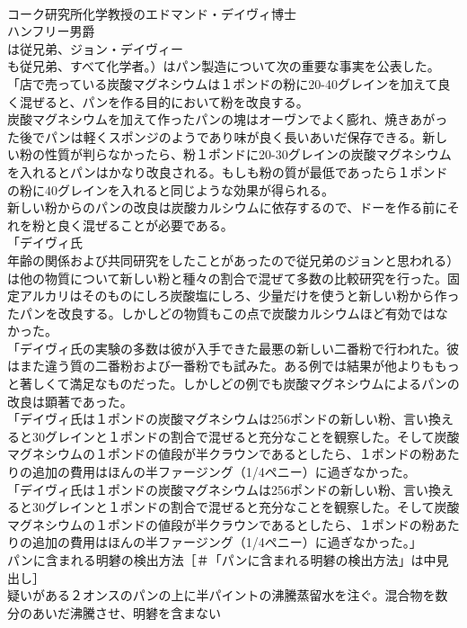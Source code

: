 \documentclass[8pt]{extreport}
\begin{document}
\begin{CJK}{UTF8}{min}
\\	コーク研究所化学教授のエドマンド・デイヴィ博士
\\	ハンフリー男爵
\\	は従兄弟、ジョン・デイヴィー
\\	も従兄弟、すべて化学者。）はパン製造について次の重要な事実を公表した。
\\	「店で売っている炭酸マグネシウムは１ポンドの粉に20-40グレインを加えて良く混ぜると、パンを作る目的において粉を改良する。
\\	炭酸マグネシウムを加えて作ったパンの塊はオーヴンでよく膨れ、焼きあがった後でパンは軽くスポンジのようであり味が良く長いあいだ保存できる。新しい粉の性質が判らなかったら、粉１ポンドに20-30グレインの炭酸マグネシウムを入れるとパンはかなり改良される。もしも粉の質が最低であったら１ポンドの粉に40グレインを入れると同じような効果が得られる。
\\	新しい粉からのパンの改良は炭酸カルシウムに依存するので、ドーを作る前にそれを粉と良く混ぜることが必要である。
\\	「デイヴィ氏
\\	年齢の関係および共同研究をしたことがあったので従兄弟のジョンと思われる）は他の物質について新しい粉と種々の割合で混ぜて多数の比較研究を行った。固定アルカリはそのものにしろ炭酸塩にしろ、少量だけを使うと新しい粉から作ったパンを改良する。しかしどの物質もこの点で炭酸カルシウムほど有効ではなかった。
\\	「デイヴィ氏の実験の多数は彼が入手できた最悪の新しい二番粉で行われた。彼はまた違う質の二番粉および一番粉でも試みた。ある例では結果が他よりももっと著しくて満足なものだった。しかしどの例でも炭酸マグネシウムによるパンの改良は顕著であった。
\\	「デイヴィ氏は１ポンドの炭酸マグネシウムは256ポンドの新しい粉、言い換えると30グレインと１ポンドの割合で混ぜると充分なことを観察した。そして炭酸マグネシウムの１ポンドの値段が半クラウンであるとしたら、１ポンドの粉あたりの追加の費用はほんの半ファージング（1/4ペニー）に過ぎなかった。
\\	「デイヴィ氏は１ポンドの炭酸マグネシウムは256ポンドの新しい粉、言い換えると30グレインと１ポンドの割合で混ぜると充分なことを観察した。そして炭酸マグネシウムの１ポンドの値段が半クラウンであるとしたら、１ポンドの粉あたりの追加の費用はほんの半ファージング（1/4ペニー）に過ぎなかった。」
\\	パンに含まれる明礬の検出方法［＃「パンに含まれる明礬の検出方法」は中見出し］
\\	疑いがある２オンスのパンの上に半パイントの沸騰蒸留水を注ぐ。混合物を数分のあいだ沸騰させ、明礬を含まない

\end{CJK}
\end{document}
